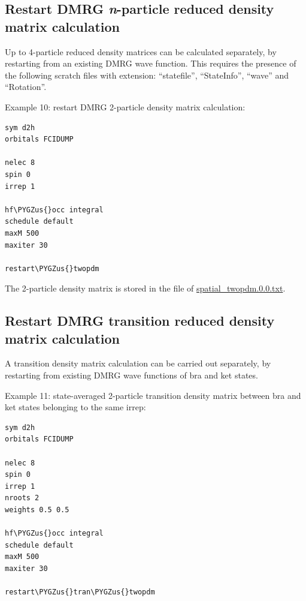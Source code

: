 \documentclass[letterpaper,10pt,english]{sphinxmanual}
\def\PYGZus{\char`\_}
\begin{document}
\subsection{Restart DMRG \emph{n}-particle reduced density matrix calculation}
\label{examples:restart-dmrg-n-particle-reduced-density-matrix-calculation}
Up to 4-particle reduced density matrices can be calculated separately, by restarting from an existing DMRG wave function.
This requires the presence of the following scratch files with  extension: ``statefile'', ``StateInfo'', ``wave'' and ``Rotation''.

Example 10: restart DMRG 2-particle density matrix calculation:

\begin{Verbatim}[commandchars=\\\{\}]
sym d2h
orbitals FCIDUMP

nelec 8
spin 0
irrep 1

hf\PYGZus{}occ integral
schedule default
maxM 500
maxiter 30

restart\PYGZus{}twopdm
\end{Verbatim}

The 2-particle density matrix is stored in the file of
\href{https://raw.githubusercontent.com/sanshar/Block/master/README\_Examples/10/spatial\_twopdm.0.0.txt}{spatial\_twopdm.0.0.txt}.


\subsection{Restart DMRG transition reduced density matrix calculation}
\label{examples:restart-dmrg-transition-reduced-density-matrix-calculation}\label{examples:transition-dm}
A transition density matrix calculation can be carried out separately, by restarting from existing DMRG wave functions of bra and ket states.

Example 11: state-averaged 2-particle transition density matrix between bra and ket states belonging to the same irrep:

\begin{Verbatim}[commandchars=\\\{\}]
sym d2h
orbitals FCIDUMP

nelec 8
spin 0
irrep 1
nroots 2
weights 0.5 0.5

hf\PYGZus{}occ integral
schedule default
maxM 500
maxiter 30

restart\PYGZus{}tran\PYGZus{}twopdm
\end{Verbatim}
\end{document}
